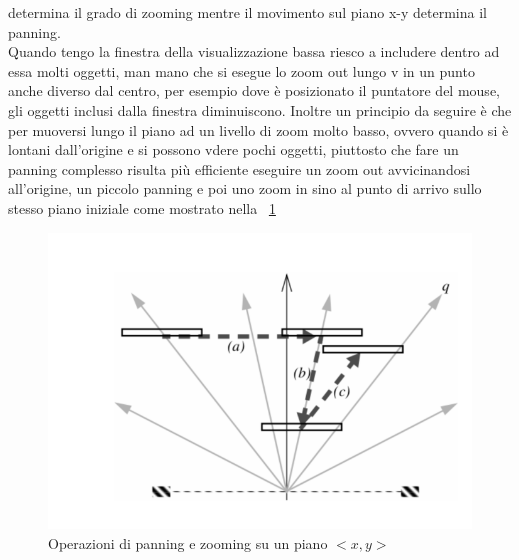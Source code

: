 {determina il grado di zooming mentre il movimento sul piano x-y determina il panning.\\
Quando tengo la finestra della visualizzazione bassa riesco a includere dentro ad essa molti oggetti, man mano che si esegue lo zoom out lungo v in un punto anche diverso dal centro, per esempio dove è posizionato il puntatore del mouse, gli oggetti inclusi dalla finestra diminuiscono.
Inoltre un principio da seguire è che per muoversi lungo il piano ad un livello di zoom molto basso, ovvero quando si è lontani dall’origine e si possono vdere pochi oggetti, piuttosto che fare un panning complesso risulta più efficiente eseguire un zoom out avvicinandosi all’origine, un piccolo
panning e poi uno zoom in sino al punto di arrivo sullo stesso piano iniziale come mostrato nella \figurename~\ref{fig:panning}
\begin{figure}[!htb]
	\begin{center}
		\includegraphics[width=1 \linewidth]{figure/panning}
	\end{center}
	\caption{Operazioni di panning e zooming su un piano $<x,y>$\label{fig:panning}}
\end{figure}

}
